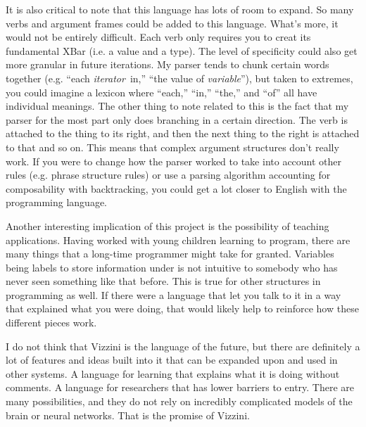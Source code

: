 \documentclass[titlepage]{article}
\newcommand{\langName}{Vizzini}
\begin{document}
It is also critical to note that this language has lots of room to expand. So many verbs and argument frames could be added to this language. What's more, it would not be entirely difficult. Each verb only requires you to creat its fundamental XBar (i.e. a value and a type). The level of specificity could also get more granular in future iterations. My parser tends to chunk certain words together (e.g. ``each \textlangle\textit{iterator}\textrangle\ in,'' ``the value of \textlangle\textit{variable}\textrangle''), but taken to extremes, you could imagine a lexicon where ``each,'' ``in,'' ``the,'' and ``of'' all have individual meanings. The other thing to note related to this is the fact that my parser for the most part only does branching in a certain direction. The verb is attached to the thing to its right, and then the next thing to the right is attached to that and so on. This means that complex argument structures don't really work. If you were to change how the parser worked to take into account other rules (e.g. phrase structure rules) or use a parsing algorithm accounting for composability with backtracking, you could get a lot closer to English with the programming language.

Another interesting implication of this project is the possibility of teaching applications. Having worked with young children learning to program, there are many things that a long-time programmer might take for granted. Variables being labels to store information under is not intuitive to somebody who has never seen something like that before. This is true for other structures in programming as well. If there were a language that let you talk to it in a way that explained what you were doing, that would likely help to reinforce how these different pieces work.

I do not think that \langName{} is the language of the future, but there are definitely a lot of features and ideas built into it that can be expanded upon and used in other systems. A language for learning that explains what it is doing without comments. A language for researchers that has lower barriers to entry. There are many possibilities, and they do not rely on incredibly complicated models of the brain or neural networks. That is the promise of \langName{}.


\newpage{}


\end{document}
